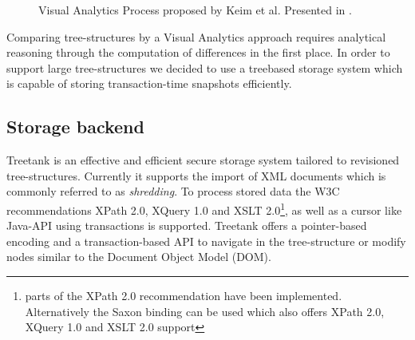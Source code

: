 \begin{figure}[htb]
\caption{\label{fig:visualanalyticsprocess} Visual Analytics Process proposed by Keim et al. Presented in \cite{keim2008visual}.}
\end{figure}


Comparing tree-structures by a Visual Analytics approach requires analytical reasoning through the computation of differences in the first place. In order to support large tree-structures we decided to use a treebased storage system which is capable of storing transaction-time snapshots efficiently.

\subsection{Storage backend}
Treetank\cite{TREETANK} is an effective and efficient secure storage system tailored to revisioned tree-structures. Currently it supports the import of XML documents which is commonly referred to as \emph{shredding}. To process stored data the W3C recommendations XPath 2.0, XQuery 1.0 and XSLT 2.0\footnote{parts of the XPath 2.0 recommendation have been implemented. Alternatively the Saxon binding can be used which also offers XPath 2.0, XQuery 1.0 and XSLT 2.0 support}, as well as a cursor like Java-API using transactions is supported. Treetank offers a pointer-based encoding and a transaction-based API to navigate in the tree-structure or modify nodes similar to the Document Object Model (DOM\cite{DOM}).

